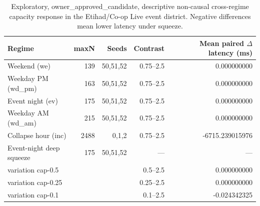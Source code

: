 \begin{table}[htbp]
\centering
\caption{Exploratory, owner\_approved\_candidate, descriptive non-causal cross-regime capacity response in the Etihad/Co-op Live event district. Negative differences mean lower latency under squeeze.}
\label{tab:capacity-cross-regime-response}
\begin{tabular}{lrrrr}
\toprule
Regime & maxN & Seeds & Contrast & Mean paired $\Delta$ latency (ms) \\
\midrule
Weekend (we) & 139 & 50,51,52 & 0.75--2.5 & 0.000000000 \\
Weekday PM (wd\_pm) & 163 & 50,51,52 & 0.75--2.5 & 0.000000000 \\
Event night (ev) & 175 & 50,51,52 & 0.75--2.5 & 0.000000000 \\
Weekday AM (wd\_am) & 215 & 50,51,52 & 0.75--2.5 & 0.000000000 \\
Collapse hour (inc) & 2488 & 0,1,2 & 0.75--2.5 & -6715.239015976 \\
\midrule
Event-night deep squeeze & 175 & 50,51,52 & --- & --- \\
\quad variation cap-0.5 & & & 0.5--2.5 & 0.000000000 \\
\quad variation cap-0.25 & & & 0.25--2.5 & 0.000000000 \\
\quad variation cap-0.1 & & & 0.1--2.5 & -0.024342325 \\
\bottomrule
\end{tabular}
\end{table}
